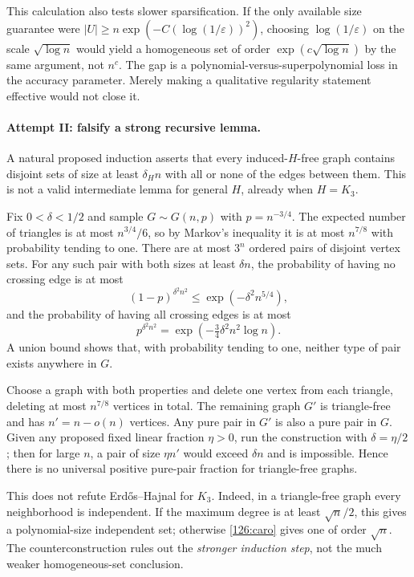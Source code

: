\documentclass[11pt,a4paper]{article}
\numberwithin{equation}{section}
\begin{document}
This calculation also tests slower sparsification.  If the only
available size guarantee were
$|U|\geq n\exp(-C(\log(1/\varepsilon))^2)$, choosing
$\log(1/\varepsilon)$ on the scale $\sqrt{\log n}$ would yield a
homogeneous set of order $\exp(c\sqrt{\log n})$ by the same argument,
not $n^c$.  The gap is a polynomial-versus-superpolynomial loss in the
accuracy parameter.  Merely making a qualitative regularity statement
effective would not close it.

\paragraph{Attempt II: falsify a strong recursive lemma.}
A natural proposed induction asserts that every induced-$H$-free graph
contains disjoint sets of size at least $\delta_H n$ with all or none
of the edges between them.  This is not a valid intermediate lemma
for general $H$, already when $H=K_3$.

Fix $0<\delta<1/2$ and sample $G\sim G(n,p)$ with $p=n^{-3/4}$.
The expected number of triangles is at most $n^{3/4}/6$, so by Markov's
inequality it is at most $n^{7/8}$ with probability tending to one.
There are at most $3^n$ ordered pairs of disjoint vertex sets.  For any
such pair with both sizes at least $\delta n$, the probability of
having no crossing edge is at most
\[
 (1-p)^{\delta^2n^2}\leq\exp(-\delta^2n^{5/4}),
\]
and the probability of having all crossing edges is at most
\[
 p^{\delta^2n^2}=\exp(-\tfrac34\delta^2n^2\log n).
\]
A union bound shows that, with probability tending to one, neither
type of pair exists anywhere in $G$.

Choose a graph with both properties and delete one vertex from each
triangle, deleting at most $n^{7/8}$ vertices in total.  The remaining
graph $G'$ is triangle-free and has $n'=n-o(n)$ vertices.  Any pure
pair in $G'$ is also a pure pair in $G$.  Given any proposed fixed
linear fraction $\eta>0$, run the construction with $\delta=\eta/2$;
then for large $n$, a pair of size $\eta n'$ would exceed $\delta n$
and is impossible.  Hence there is no universal positive pure-pair
fraction for triangle-free graphs.

This does not refute Erd\H{o}s--Hajnal for $K_3$.  Indeed, in a
triangle-free graph every neighborhood is independent.  If the maximum
degree is at least $\sqrt n/2$, this gives a polynomial-size independent
set; otherwise \eqref{126:caro} gives one of order $\sqrt n$.
The counterconstruction rules out the \emph{stronger induction step},
not the much weaker homogeneous-set conclusion.
\end{document}
